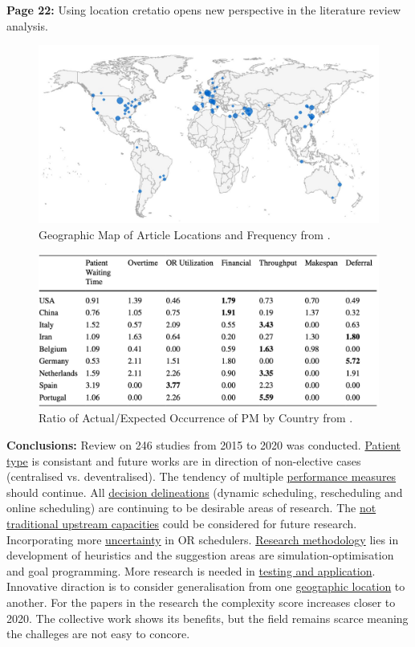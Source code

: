     \textbf{Page 22:}
    Using location cretatio opens new perspective in the literature review analysis.
    \begin{figure}[H]
        \centering
        \includegraphics[width=1\textwidth]{figures/SR0002US22/fig4.png}
        \caption{Geographic Map of Article Locations and Frequency from \cite{x079}.}
        \label{fig4:SR0002US22}
    \end{figure}
    \begin{figure}[H]
        \centering
        \includegraphics[width=1\textwidth]{figures/SR0002US22/fig5.png}
        \caption{Ratio of Actual/Expected Occurrence of PM by Country from \cite{x079}.}
        \label{fig5:SR0002US22}
    \end{figure}
    
    \textbf{Conclusions:}
    Review on 246 studies from 2015 to 2020 was conducted. \underline{Patient type} is consistant and future works are in direction of non-elective cases (centralised vs. deventralised). The tendency of multiple \underline{performance measures} should continue. All \underline{decision delineations} (dynamic scheduling, rescheduling and online scheduling) are continuing to be desirable areas of research. The \underline{not traditional upstream capacities} could be considered for future research. Incorporating more \underline{uncertainty} in OR schedulers. \underline{Research methodology} lies in development of heuristics and the suggestion areas are simulation-optimisation and goal programming. More research is needed in \underline{testing and application}. Innovative diraction is to consider generalisation from one \underline{geographic location} to another. For the papers in the research the complexity score increases closer to 2020. The collective work shows its benefits, but the field remains scarce meaning the challeges are not easy to concore.